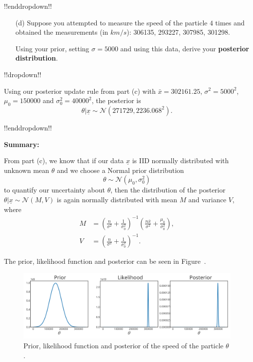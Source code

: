 {!!enddropdown!!

\clearpage

\begin{itemize}
\item [(d)] Suppose you attempted to measure the speed of the particle $4$ times and obtained the measurements (in $km/s$): 306135, 293227, 307985, 301298.

Using your prior, setting $\sigma = 5000$ and using this data, derive your \textbf{\color{darkblue}posterior distribution}.
\end{itemize}
!!dropdown!!

Using our posterior update rule from part (c) with $\bar{x} = 302161.25$, $\sigma^2 = 5000^2$, $\mu_0 = 150000$ and $\sigma_0^2 = 40000^2$, the posterior is
    $$ \theta | \underline{x} \sim \mathcal{N}(271729, 2236.068^2).$$

!!enddropdown!!

\textbf{Summary:}

From part (c), we know that if our data $\underline{x}$ is IID normally distributed with unknown mean $\theta$ and we choose a Normal prior distribution 
$$\theta \sim \mathcal{N}(\mu_0,\sigma^2_0)$$
to quantify our uncertainty about $\theta$, then the distribution of the posterior $\theta|\underline{x}\sim \mathcal{N}(M, V)$ is again normally distributed with mean $M$ and variance $V$, where
\begin{align*}
    M &= \left(\frac{n}{\sigma^2} + \frac{1}{\sigma_0^2}\right)^{-1}\left(\frac{n\bar{x}}{\sigma^2} + \frac{\mu_0}{\sigma_0^2}\right), \\
    V &= \left(\frac{n}{\sigma^2} + \frac{1}{\sigma_0^2}\right)^{-1}.
\end{align*}

The prior, likelihood function and posterior can be seen in Figure~.

\begin{figure}[h] 

\includegraphics{images/speed_priorposterior.svg}
\caption{Prior, likelihood function and posterior of the speed of the particle $\theta$.}


\end{figure}}

